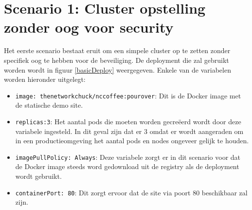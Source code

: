 \clearpage
\section{Scenario 1: Cluster opstelling zonder oog voor security}

Het eerste scenario bestaat eruit om een simpele cluster op te zetten zonder specifiek oog te hebben voor de beveiliging. De deployment die zal gebruikt worden wordt in figuur \ref{basicDeploy} weergegeven. Enkele van de variabelen worden hieronder uitgelegt: 
\begin{itemize}
	\item \verb|image: thenetworkchuck/nccoffee:pourover|: Dit is de Docker image met de statische demo site.
	\item \verb|replicas:3|: Het aantal pods die moeten worden gecreëerd wordt door deze variabele ingesteld. In dit geval zijn dat er 3 omdat er wordt aangeraden om in een productieomgeving het aantal pods en nodes ongeveer gelijk te houden.
	\item \verb|imagePullPolicy: Always|: Deze variabele zorgt er in dit scenario voor dat de Docker image steeds word gedownload uit de registry als de deployment wordt gebruikt.
	\item \verb|containerPort: 80|: Dit zorgt ervoor dat de site via poort 80 beschikbaar zal zijn.
\end{itemize}

